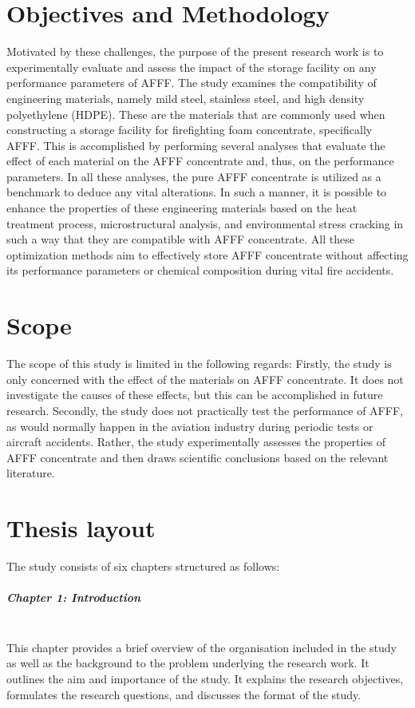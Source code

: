 \section{Objectives and Methodology}
Motivated by these challenges, the purpose of the present research work is to experimentally evaluate and assess the impact of the storage facility on any performance parameters of AFFF. The study examines the compatibility of engineering materials, namely mild steel, stainless steel, and high density polyethylene (HDPE). These are the materials that are commonly used when constructing a storage facility for firefighting foam concentrate, specifically AFFF. This is accomplished by performing several analyses that evaluate the effect of each material on the AFFF concentrate and, thus, on the performance parameters. In all these analyses, the pure AFFF concentrate is utilized as a benchmark to deduce any vital alterations. In such a manner, it is possible to enhance the properties of these engineering materials based on the heat treatment process, microstructural analysis, and environmental stress cracking in such a way that they are compatible with AFFF concentrate. All these optimization methods aim to effectively store AFFF concentrate without affecting its performance parameters or chemical composition during vital fire accidents.

\section{Scope}
The scope of this study is limited in the following regards: Firstly, the study is only concerned with the effect of the materials on AFFF concentrate. It does not investigate the causes of these effects, but this can be accomplished in future research. Secondly, the study does not practically test the performance of AFFF, as would normally happen in the aviation industry during periodic tests or aircraft accidents. Rather, the study experimentally assesses the properties of AFFF concentrate and then draws scientific conclusions based on the relevant literature.

\section{Thesis layout}
The study consists of six chapters structured as follows:

\subparagraph*{Chapter 1: Introduction}\hfill\\
This chapter provides a brief overview of the organisation included in the study as well as the background to the problem underlying the research work. It outlines the aim and importance of the study. It explains the research objectives, formulates the research questions, and discusses the format of the study.

